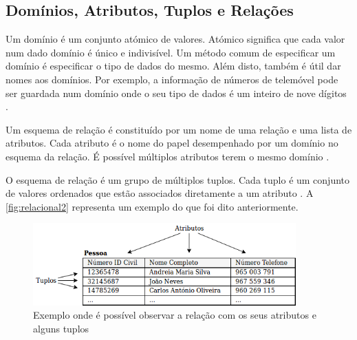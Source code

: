 \documentclass[11pt,twoside,a4paper]{report}
\begin{document}
\subsection{Domínios, Atributos, Tuplos e Relações}
Um domínio é um conjunto atómico de valores. Atómico significa que cada valor num dado domínio é único e indivisível. Um método comum de especificar um domínio é especificar o tipo de dados do mesmo. Além disto, também é útil dar nomes aos domínios. Por exemplo, a informação de números de telemóvel pode ser guardada num domínio onde o seu tipo de dados é um inteiro de nove dígitos \cite{Elmasri:2010:FDS:1855347}.\par
Um esquema de relação é constituído por um nome de uma relação e uma lista de atributos. Cada atributo é o nome do papel desempenhado por um domínio no esquema da relação. É possível múltiplos atributos terem o mesmo domínio \cite{Elmasri:2010:FDS:1855347}.\par 
O esquema de relação é um grupo de múltiplos tuplos. Cada tuplo é um conjunto de valores ordenados que estão associados diretamente a um atributo \cite{Elmasri:2010:FDS:1855347}. A \autoref{fig:relacional2} representa um exemplo do que foi dito anteriormente.
\vspace{2cm}
\begin{figure}[H]
	\hspace{-2cm}
	
		\includegraphics[width=0.9\textwidth]{exemplo_relacional} %
		\caption[Exemplo de atributos e tuplos]{Exemplo onde é possível observar a relação com os seus atributos e alguns tuplos}
		\label{fig:relacional2}
	
\end{figure}

\newpage
\end{document}
